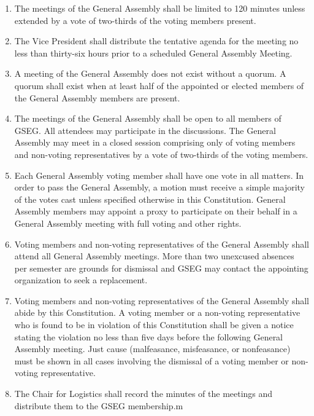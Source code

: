 \begin{enumerate}[label=\Alph*.]
	\item The meetings of the General Assembly shall be limited to 120 minutes unless extended
	by a vote of two-thirds of the voting members present.

	\item The Vice President shall distribute the tentative agenda for the meeting no less than
	thirty-six hours prior to a scheduled General Assembly Meeting.

	\item A meeting of the General Assembly does not exist without a quorum. A quorum shall exist
	when at least half of the appointed or elected members of the General Assembly members are
	present.

	\item The meetings of the General Assembly shall be open to all members of GSEG. All attendees
	may participate in the discussions. The General Assembly may meet in a closed session
	comprising only of voting members and non-voting representatives by a vote of two-thirds of the
	voting members.

	\item Each General Assembly voting member shall have one vote in all matters. In order to pass
	the General Assembly, a motion must receive a simple majority of the votes cast unless
	specified otherwise in this Constitution. General Assembly members may appoint a proxy to participate on their behalf in a General Assembly meeting with full voting and other rights.

	\item Voting members and non-voting representatives of the General Assembly shall attend all
	General Assembly meetings. More than two unexcused absences per semester are grounds for
	dismissal and GSEG may contact the appointing organization to seek a replacement.

	\item Voting members and non-voting representatives of the General Assembly shall abide by
	this Constitution. A voting member or a non-voting representative who is found to be in
	violation of this Constitution shall be given a notice stating the violation no less
	than five days before the following General Assembly meeting. Just cause (malfeasance,
	misfeasance, or nonfeasance) must be shown in all cases involving the dismissal of a voting
	member or non-voting representative.

	\item The Chair for Logistics shall record the minutes of the meetings and distribute them to
	the GSEG membership.m

\end{enumerate}
